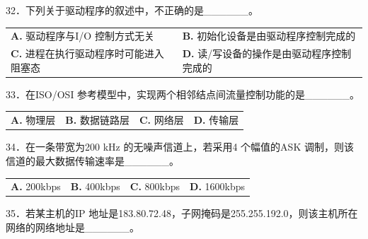 \documentclass[UTF8,11pt]{ctexart}
\begin{document}
32．下列关于驱动程序的叙述中，不正确的是\_\_\_\_\_\_。


\begin{center}\begin{tabular}{>{\raggedright\arraybackslash}p{\dimexpr(\linewidth-4\tabcolsep)/2\relax}>{\raggedright\arraybackslash}p{\dimexpr(\linewidth-4\tabcolsep)/2\relax}}
\textbf{A.} 驱动程序与I/O 控制方式无关 & \textbf{B.} 初始化设备是由驱动程序控制完成的\\[.35em]
\textbf{C.} 进程在执行驱动程序时可能进入阻塞态 & \textbf{D.} 读/写设备的操作是由驱动程序控制完成的\\[.35em]\end{tabular}\end{center}

33．在ISO/OSI 参考模型中，实现两个相邻结点间流量控制功能的是\_\_\_\_\_\_。


\begin{center}\begin{tabular}{>{\raggedright\arraybackslash}p{\dimexpr(\linewidth-8\tabcolsep)/4\relax}>{\raggedright\arraybackslash}p{\dimexpr(\linewidth-8\tabcolsep)/4\relax}>{\raggedright\arraybackslash}p{\dimexpr(\linewidth-8\tabcolsep)/4\relax}>{\raggedright\arraybackslash}p{\dimexpr(\linewidth-8\tabcolsep)/4\relax}}
\textbf{A.} 物理层 & \textbf{B.} 数据链路层 & \textbf{C.} 网络层 & \textbf{D.} 传输层\\[.35em]\end{tabular}\end{center}

34．在一条带宽为200 kHz 的无噪声信道上，若采用4 个幅值的ASK 调制，则该信道的最大数据传输速率是\_\_\_\_\_\_。


\begin{center}\begin{tabular}{>{\raggedright\arraybackslash}p{\dimexpr(\linewidth-8\tabcolsep)/4\relax}>{\raggedright\arraybackslash}p{\dimexpr(\linewidth-8\tabcolsep)/4\relax}>{\raggedright\arraybackslash}p{\dimexpr(\linewidth-8\tabcolsep)/4\relax}>{\raggedright\arraybackslash}p{\dimexpr(\linewidth-8\tabcolsep)/4\relax}}
\textbf{A.} 200kbps & \textbf{B.} 400kbps & \textbf{C.} 800kbps & \textbf{D.} 1600kbps\\[.35em]\end{tabular}\end{center}

35．若某主机的IP 地址是183.80.72.48，子网掩码是255.255.192.0，则该主机所在网络的网络地址是\_\_\_\_\_\_。
\end{document}
